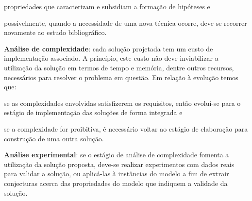 \begin{compactenum}
\begin{compactenum}[(i)]
        propriedades que caracterizam e subsidiam a formação de hipóteses e
    \item possivelmente, quando a necessidade de uma nova técnica ocorre,
        deve-se recorrer novamente ao estudo bibliográfico.
    \end{compactenum}
\item {\bf Análise de complexidade}: cada solução projetada tem um custo de
    implementação associado.
    A princípio, este custo não deve inviabilizar a utilização da solução em
    termos de tempo e memória, dentre outros recursos, necessários para
    resolver o problema em questão.
    Em relação à evolução temos que:
    \begin{compactenum}[(i)]
    \item se as complexidades envolvidas satisfizerem os requisitos, então
        evolui-se para o estágio de implementação das soluções de forma
        integrada e
    \item se a complexidade for proibitiva, é necessário voltar ao estágio de
        elaboração para construção de uma outra solução.
    \end{compactenum}
\item {\bf Análise experimental}: se o estágio de análise de complexidade
    fomenta a utilização da solução proposta, deve-se realizar experimentos com
    dados reais para validar a solução, ou aplicá-las à instâncias do modelo a
    fim de extrair conjecturas acerca das propriedades do modelo que indiquem a
    validade da solução.
\end{compactenum}

